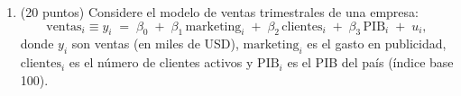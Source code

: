 \documentclass[10pt,a4paper]{article}
\begin{document}
\begin{enumerate}








      \color{black}  
    \item (20 puntos) Considere el modelo de ventas trimestrales de una empresa:
\[
\text{ventas}_i \equiv y_i \;=\; \beta_0 \;+\; \beta_1\,\text{marketing}_i \;+\; \beta_2\,\text{clientes}_i \;+\; \beta_3\,\text{PIB}_i \;+\; u_i,
\]
donde \(y_i\) son ventas (en miles de USD), \(\text{marketing}_i\) es el gasto en publicidad,
\(\text{clientes}_i\) es el número de clientes activos y \(\text{PIB}_i\) es el PIB del país (índice base 100).


\end{enumerate}
\end{document}
